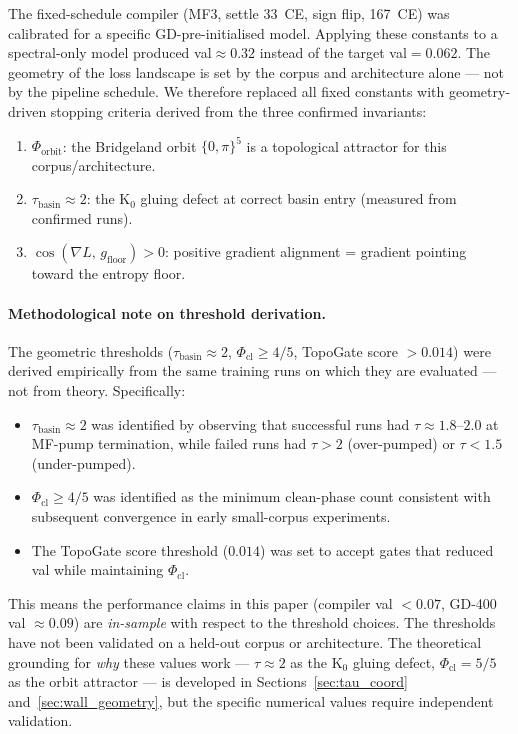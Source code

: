 \documentclass[11pt]{amsart}
\begin{document}
The fixed-schedule compiler (MF3, settle 33~CE, sign flip, 167~CE)
was calibrated for a specific GD-pre-initialised model.
Applying these constants to a spectral-only model produced val$\approx 0.32$
instead of the target val$=0.062$.
The geometry of the loss landscape is set by the corpus and architecture alone
--- not by the pipeline schedule.
We therefore replaced all fixed constants with geometry-driven stopping criteria
derived from the three confirmed invariants:
\begin{enumerate}
\item $\Phi_\mathrm{orbit}$: the Bridgeland orbit $\{0,\pi\}^5$
  is a topological attractor for this corpus/architecture.
\item $\tau_\mathrm{basin} \approx 2$: the K$_0$ gluing defect
  at correct basin entry (measured from confirmed runs).
\item $\cos(\nabla L,\, g_\mathrm{floor}) > 0$:
  positive gradient alignment = gradient pointing toward the entropy floor.
\end{enumerate}

\paragraph{Methodological note on threshold derivation.}
The geometric thresholds ($\tau_\mathrm{basin} \approx 2$,
$\Phi_\mathrm{cl} \geq 4/5$, TopoGate score $> 0.014$) were derived
empirically from the same training runs on which they are evaluated ---
not from theory.
Specifically:
\begin{itemize}
\item $\tau_\mathrm{basin} \approx 2$ was identified by observing that
  successful runs had $\tau \approx 1.8$--$2.0$ at MF-pump termination,
  while failed runs had $\tau > 2$ (over-pumped) or $\tau < 1.5$
  (under-pumped).
\item $\Phi_\mathrm{cl} \geq 4/5$ was identified as the minimum
  clean-phase count consistent with subsequent convergence in early
  small-corpus experiments.
\item The TopoGate score threshold ($0.014$) was set to accept gates
  that reduced val while maintaining $\Phi_\mathrm{cl}$.
\end{itemize}
This means the performance claims in this paper (compiler val $< 0.07$,
GD-400 val $\approx 0.09$) are \emph{in-sample} with respect to the
threshold choices.
The thresholds have not been validated on a held-out corpus or
architecture.
The theoretical grounding for \emph{why} these values work ---
$\tau \approx 2$ as the K$_0$ gluing defect,
$\Phi_\mathrm{cl} = 5/5$ as the orbit attractor ---
is developed in Sections~\ref{sec:tau_coord} and~\ref{sec:wall_geometry},
but the specific numerical values require independent validation.
\end{document}
